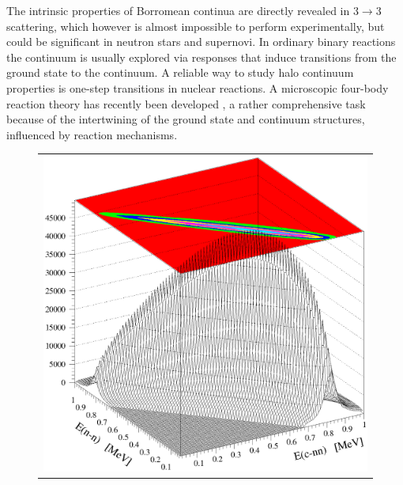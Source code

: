 The intrinsic properties of Borromean continua are directly
revealed in $3\rightarrow3$ scattering, which however is almost
impossible to perform experimentally, but could be significant in
neutron stars and supernovi. In ordinary binary reactions the
continuum is usually explored via responses that induce
transitions from the ground state to the continuum. A reliable way
to study halo continuum properties is one-step transitions in
nuclear reactions. A microscopic four-body reaction theory has
recently been developed \cite{ershov1}, a rather comprehensive task
because of the intertwining of the ground state and continuum
structures, influenced by reaction mechanisms.

\begin{figure}[tbh]
\vspace*{-0.2cm}
\begin{center}
\begin{tabular}{c}
\includegraphics[scale=0.31]{figures/2+nnj=2-2.eps} %

\end{tabular}
\end{center}
\end{figure}
